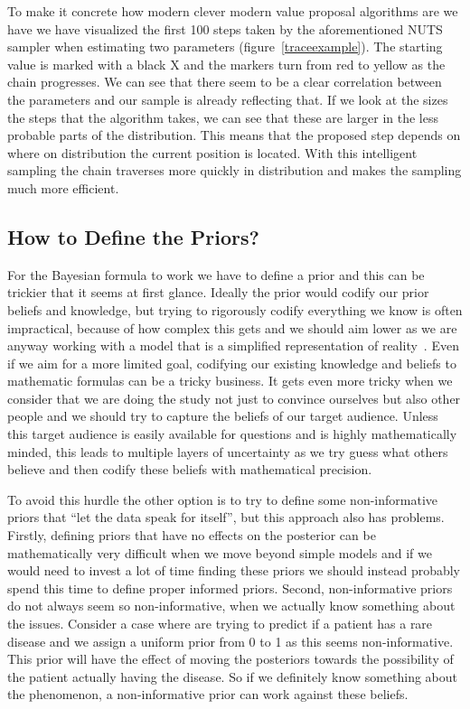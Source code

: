 \documentclass[12pt,a4paper,leqno]{report}
\theoremstyle{plain}
\theoremstyle{definition}
\theoremstyle{remark}
\begin{document}
To make it concrete how modern clever modern value proposal algorithms are we
have we have visualized the first 100 steps taken by the aforementioned NUTS sampler
when estimating two parameters (figure\ \ref{traceexample}). The starting value is
marked with a black X and the markers turn from red to yellow as the chain progresses.
We can see that there seem to be a clear correlation between the parameters and our
sample is already reflecting that. If we look at the sizes the steps that the algorithm
takes, we can see that these are larger in the less probable parts of the distribution.
This means that the proposed step depends on where on distribution the current position
is located. With this intelligent sampling the chain traverses more
quickly in distribution and makes the sampling much more efficient.

\subsection{How to Define the Priors?}\label{bayesproblems}

For the Bayesian formula to work we have to define a prior and this can be
trickier that it seems at first glance. Ideally the prior would codify our prior
beliefs and knowledge, but trying to rigorously codify everything we
know is often impractical, because of how complex this gets and we should aim lower as we are
anyway working with a model that is a simplified representation of reality\ \cite{gelman}. Even if
we aim for a more limited goal, codifying our existing knowledge and beliefs
to mathematic formulas can be a tricky business. It gets even more
tricky when we consider that we are doing the study not just to convince ourselves
but also other people and we should try to capture the beliefs of our target audience.
Unless this target audience is easily available for questions and is highly mathematically minded,
this leads to multiple layers of uncertainty as we try guess what others
believe and then codify these beliefs with mathematical precision.

To avoid this hurdle the other option is to try to define some non-informative
priors that ``let the data speak for itself'', but this approach also has
problems. Firstly, defining priors that have no effects on the posterior can be mathematically
very difficult when we move beyond simple models and if we would need
to invest a lot of time finding these priors we should instead probably spend this time
to define proper informed priors. Second, non-informative priors do not always
seem so non-informative, when we actually know something about the issues.
Consider a case where are trying to predict if a patient has a rare disease
and we assign a uniform prior from 0 to 1 as this seems non-informative. This
prior will have the effect of moving the posteriors towards the
possibility of the patient actually having the disease. So if we definitely know
something about the phenomenon, a non-informative prior can work against these
beliefs.\ \cite{gelman}
\end{document}
